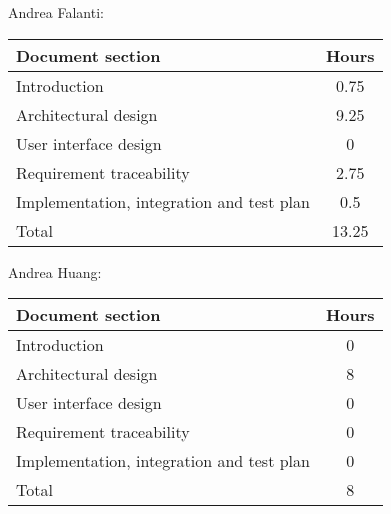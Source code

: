 Andrea Falanti:

\begin{tabular}{|l|c|}
    \hline
    Document section & Hours \\
    \hline
     Introduction & 0.75\\
     Architectural design & 9.25\\
     User interface design & 0\\
     Requirement traceability & 2.75\\
     Implementation, integration and test plan & 0.5\\
     \hline
     Total & 13.25\\
     \hline
\end{tabular}
\vskip 0.3in

Andrea Huang:

\begin{tabular}{|l|c|}
    \hline
    Document section & Hours \\
    \hline
     Introduction & 0\\
     Architectural design & 8\\
     User interface design & 0\\
     Requirement traceability & 0\\
     Implementation, integration and test plan & 0\\
     \hline
     Total & 8\\
     \hline
\end{tabular}